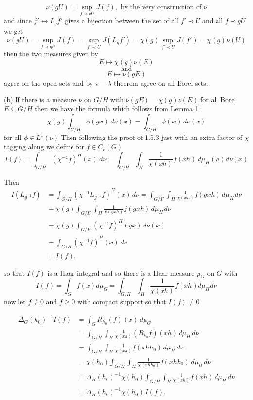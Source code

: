 \documentclass{article}
\begin{document}
$$\nu(gU) = \sup\limits_{f \prec gU} J(f), \text{ by the very construction of } \nu$$
and since $f' \longleftrightarrow L_g f'$ gives a bijection between the set of all $f' \prec U$ and all $f \prec gU$ we get
$$\nu(gU) =\sup\limits_{f \prec gU} J(f) = \sup\limits_{f' \prec U}J(L_gf') = \chi(g) \sup\limits_{f' \prec U}J(f') = \chi(g) \nu(U)$$
then the two measures given by 
$$E \mapsto \chi(g)\nu(E)$$ 
$$\text{and}$$ 
$$E \mapsto \nu(gE)$$ 
agree on the open sets and by $\pi-\lambda$ theorem agree on all Borel sets.
\vspace{0.3cm}

(b) If there is a measure $\nu$ on $G/H$ with $\nu(gE) = \chi(g) \nu(E)$ for all Borel $E \subseteq G/H$ then we have the formula which follows from Lemma 1: $$\chi(g) \int_{G/H} \phi(gx) \ d\nu(x) = \int_{G/H} \phi(x) \ d\nu(x)$$ for all $\phi \in L^1(\nu)$
Then following the proof of 1.5.3 just with an extra factor of $\chi$ tagging along we define for $f \in C_c(G)$
$$I(f) = \int_{G/H} (\chi^{-1} f)^H(x) \ d\nu = \int_{G/H} \int_H \frac{1}{\chi(xh)} f(xh) \ d\mu_H(h) d\nu(x)$$ 

Then 
\begin{align*}
I(L_{g^{-1}}f)
&= \int_{G/H} (\chi^{-1} L_{g^{-1}}f)^H(x)\,d\nu
   = \int_{G/H}\int_H \frac{1}{\chi(xh)} f(gxh)\,d\mu_H\,d\nu \\[0.3em]
&= \chi(g)\int_{G/H}\int_H \frac{1}{\chi(gxh)} f(gxh)\,d\mu_H\,d\nu \\[0.3em]
&= \chi(g)\int_{G/H} (\chi^{-1}f)^H(gx)\,d\nu(x)\\[0.3em]
&= \int_{G/H} (\chi^{-1}f)^H(x)\,d\nu \\[0.3em]
&= I(f).
\end{align*}

so that $I(f)$ is a Haar integral and so there is a Haar measure $\mu_G$ on $G$ with 
$$I(f) = \int_G f(x) d \mu_G =  \int_{G/H} \int_H \frac{1}{\chi(xh)}f(xh) d\mu_H d\nu$$
now let $f \neq 0$ and $f \geq 0$ with compact support so that $I(f) \neq 0$

\begin{align*}
\Delta_G(h_0)^{-1} I(f)
&= \int_G R_{h_0}(f)(x)\, d\mu_G \\[0.3em]
&= \int_{G/H} \int_H \frac{1}{\chi(xh)} (R_{h_0}f)(xh)\, d\mu_H \, d\nu \\[0.3em]
&= \int_{G/H} \int_H \frac{1}{\chi(xh)} f(xhh_0)\, d\mu_H \, d\nu \\[0.3em]
&= \chi(h_0) \int_{G/H} \int_H \frac{1}{\chi(xhh_0)} f(xhh_0)\, d\mu_H \, d\nu \\[0.3em]
&= \Delta_H(h_0)^{-1}\chi(h_0)
   \int_{G/H} \int_H \frac{1}{\chi(xh)} f(xh)\, d\mu_H \, d\nu \\[0.3em]
&= \Delta_H(h_0)^{-1}\chi(h_0)\, I(f).
\end{align*}
\end{document}
